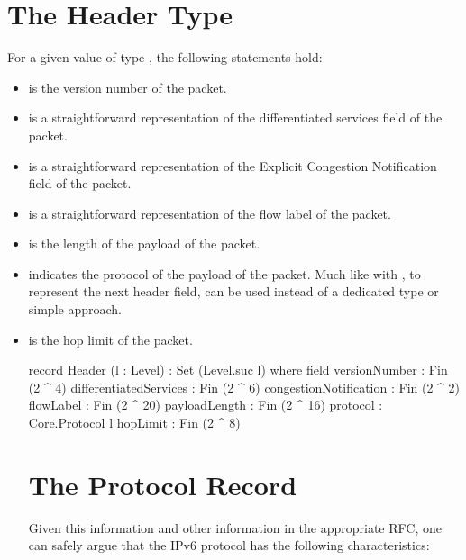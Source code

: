 \documentclass{report}
\begin{document}
\section{The Header Type}
For a given value  of type  , the following statements hold:

\begin{itemize}
  \item {}  is the version number of the  packet.
  \item {}  is a straightforward representation of the differentiated services field of the  packet.
  \item {}  is a straightforward representation of the Explicit Congestion Notification field of the  packet.
  \item {}  is a straightforward representation of the flow label of the  packet.
  \item {}  is the length of the payload of the  packet.
  \item {}  indicates the protocol of the payload of the  packet.  Much like with , to represent the next header field,  can be used instead of a dedicated type or simple  approach.
  \item {}  is the hop limit of the  packet.

\begin{code}
  record Header (l : Level) : Set (Level.suc l) where
    field
      versionNumber : Fin (2 ^ 4)
      differentiatedServices : Fin (2 ^ 6)
      congestionNotification : Fin (2 ^ 2)
      flowLabel : Fin (2 ^ 20)
      payloadLength : Fin (2 ^ 16)
      protocol : Core.Protocol l
      hopLimit : Fin (2 ^ 8)
\end{code}

\section{The Protocol Record}
Given this information and other information in the appropriate RFC, one can safely argue that the IPv6 protocol has the following characteristics:


\end{itemize}
\end{document}
